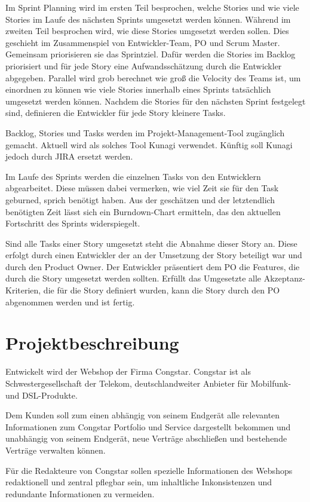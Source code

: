 \documentclass[11pt,a4paper]{article} %
\begin{document}
Im Sprint Planning wird im ersten Teil besprochen, welche Stories und wie viele Stories 
im Laufe des nächsten Sprints umgesetzt werden können. Während im zweiten Teil
besprochen wird, wie diese Stories umgesetzt werden sollen.
Dies geschieht im Zusammenspiel von Entwickler-Team, PO und Scrum Master. Gemeinsam priorisieren sie das Sprintziel. 
Dafür werden die Stories im Backlog priorisiert und für jede Story eine
Aufwandsschätzung durch die Entwickler abgegeben.
Parallel wird grob berechnet wie groß die Velocity des Teams ist, um
einordnen zu können wie viele Stories innerhalb eines Sprints tatsächlich
umgesetzt werden können. Nachdem die Stories für den nächsten Sprint
festgelegt sind, definieren die Entwickler für jede Story kleinere Tasks.

Backlog, Stories und Tasks werden im Projekt-Management-Tool
zugänglich gemacht. Aktuell wird als solches Tool Kunagi verwendet. Künftig
soll Kunagi jedoch durch JIRA ersetzt werden.

Im Laufe des Sprints werden die einzelnen Tasks von den Entwicklern abgearbeitet.
Diese müssen dabei vermerken, wie viel Zeit sie für den Task geburned, sprich benötigt haben. Aus der
geschätzen und der letztendlich benötigten Zeit lässt sich ein Burndown-Chart
ermitteln, das den aktuellen Fortschritt des Sprints widerspiegelt.

Sind alle Tasks einer Story umgesetzt steht die Abnahme dieser Story an. Diese erfolgt 
durch einen Entwickler der an der Umsetzung der Story beteiligt war und durch den Product Owner. 
Der Entwickler präsentiert dem PO die Features, die durch die Story umgesetzt
werden sollten.
Erfüllt das Umgesetzte alle Akzeptanz-Kriterien, die für die Story definiert
wurden, kann die Story durch den PO abgenommen werden und ist fertig.

\section{Projektbeschreibung} \label{sec:projekt}

Entwickelt wird der Webshop der Firma Congstar. Congstar ist als Schwestergesellschaft der Telekom, 
deutschlandweiter Anbieter für Mobilfunk- und DSL-Produkte. 

Dem Kunden soll zum einen abhängig von seinem Endgerät alle relevanten
Informationen zum Congstar Portfolio und Service dargestellt bekommen und
unabhängig von seinem Endgerät, neue Verträge abschließen und bestehende
Verträge verwalten können.

Für die Redakteure von Congstar sollen spezielle Informationen des Webshops
redaktionell und zentral pflegbar sein, um inhaltliche Inkonsistenzen und redundante Informationen zu vermeiden. 
\end{document}
